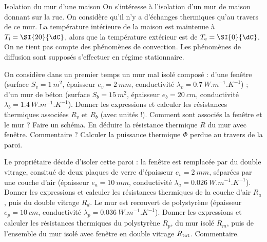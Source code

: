 \begin{exo}[PC]{Isolation du mur d'une maison}
On s'intéresse à l'isolation d'un mur de maison donnant sur la rue. On considère qu'il n'y a d'échanges thermiques qu'au travers de ce mur.
La température intérieure de la maison est maintenue à $T_{\rm i} =\SI{20}{\dC}$, alors que la température extérieur est de $T_{\rm e} = \SI{0}{\dC}$.
On ne tient pas compte des phénomènes de convection. Les phénomènes de diffusion sont supposés s'effectuer en régime stationnaire.
\begin{quest}
\item On considère dans un premier temps un mur mal isolé composé : d'une fenêtre (surface $S_v=\SI{1}{m^2}$, épaisseur $e_v=\SI{2}{mm}$, conductivité $\lambda_v=\SI{0.7}{W.m^{-1}.K^{-1}}$) ;
d'un mur de béton (surface $S_b=\SI{15}{m^2}$, épaisseur $e_b=\SI{20}{cm}$, conductivité $\lambda_b=\SI{1.4}{W.m^{-1}.K^{-1}}$). Donner les expressions et calculer les résistances thermiques associées $R_v$ et $R_b$ (avec unités !).
Comment sont associés la fenêtre et le mur ? Faire un schéma. En déduire la résistance thermique $R$ du mur avec fenêtre. Commentaire ? Calculer la puissance thermique $\Phi$ perdue au travers de la paroi.
\item Le propriétaire décide d'isoler cette paroi : la fenêtre est remplacée par du double vitrage, consitué de deux plaques de verre d'épaisseur $e_v=\SI{2}{mm}$, séparées par une couche d'air (épaisseur $e_a=\SI{10}{mm}$, conductivité $\lambda_a = \SI{0.026}{W.m^{-1}.K^{-1}}$).
Donner les expressions et calculer les résistances thermiques de la couche d'air $R_a$, puis du double vitrage $R_d$. Le mur est recouvert de polystyrène (épaisseur $e_p=\SI{10}{cm}$, conductivité $\lambda_p = \SI{0.036}{W.m^{-1}.K^{-1}}$).
Donner les expressions et calculer les résistances thermiques du polystyrène $R_p$, du mur isolé $R_m$, puis de l'ensemble du mur isolé avec fenêtre en double vitrage $R_{\rm tot}$. Commentaire.
\end{quest}
\end{exo}



